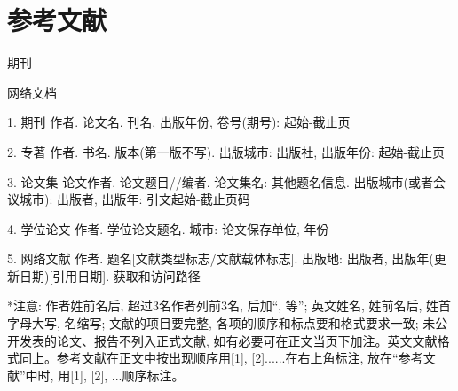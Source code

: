 \documentclass[UTF8,openany,AutoFakeBold,AutoFakeSlant,cs4size]{ctexbook}
\begin{document}
\normalsize
\linespread{1.5}\selectfont
{
	\fancyhf{}
	\fancyhead[RE,RO]{\leftmark}
	\fancyfoot[CO,CE]{~\thepage~}
	\renewcommand{\headrulewidth}{0.7pt}
	\renewcommand{\footrulewidth}{0pt}
}
\fancyhf{}
\fancyhead[RE,RO]{\leftmark}
\fancyfoot[CO,CE]{~\thepage~}
\renewcommand{\headrulewidth}{0.7pt}
\renewcommand{\footrulewidth}{0pt}








%


\chapter*{参考文献}
\noindent
\begin{enumerate}[{[1]}]
\small
	\item 期刊
	\item 网络文档
\end{enumerate}

1.	期刊  作者. 论文名. 刊名, 出版年份, 卷号(期号): 起始-截止页

2.	专著  作者. 书名. 版本(第一版不写). 出版城市: 出版社, 出版年份: 起始-截止页

3.	论文集  论文作者. 论文题目//编者. 论文集名: 其他题名信息. 出版城市(或者会议城市): 出版者, 出版年: 引文起始-截止页码

4.	学位论文  作者. 学位论文题名. 城市: 论文保存单位, 年份

5.	网络文献  作者. 题名[文献类型标志/文献载体标志]. 出版地: 出版者, 出版年(更新日期)[引用日期]. 获取和访问路径

*注意: 作者姓前名后, 超过3名作者列前3名, 后加“, 等”; 英文姓名, 姓前名后, 姓首字母大写, 名缩写; 文献的项目要完整, 各项的顺序和标点要和格式要求一致; 未公开发表的论文、报告不列入正式文献, 如有必要可在正文当页下加注。英文文献格式同上。参考文献在正文中按出现顺序用[1], [2]......在右上角标注, 放在“参考文献”中时, 用[1], [2], ...顺序标注。



{
	\fancyhf{}
	\fancyfoot[CO,CE]{~\thepage~}
	\renewcommand{\headrulewidth}{0.7pt}
	\renewcommand{\footrulewidth}{0pt}
}
\fancyhf{}
\fancyfoot[CO,CE]{~\thepage~}
\renewcommand{\headrulewidth}{0.7pt}
\renewcommand{\footrulewidth}{0pt}
\end{document}
